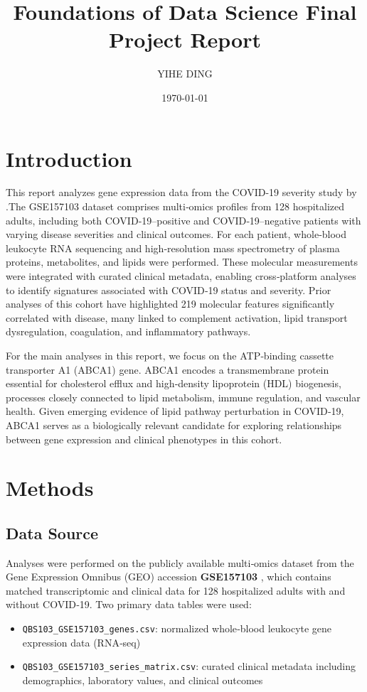 \documentclass[a4paper,12pt]{article}
\title{\textbf{Foundations of Data Science Final Project Report}}
\author{YIHE DING}
\date{\today}
\begin{document}
\maketitle
\tableofcontents
\newpage


\section{Introduction}

This report analyzes gene expression data from the COVID-19 severity study by \cite{overmyer2021large}.The GSE157103 dataset comprises multi‑omics profiles from 128 hospitalized adults, including both COVID‑19–positive and COVID‑19–negative patients with varying disease severities and clinical outcomes. For each patient, whole‑blood leukocyte RNA sequencing and high‑resolution mass spectrometry of plasma proteins, metabolites, and lipids were performed. These molecular measurements were integrated with curated clinical metadata, enabling cross‑platform analyses to identify signatures associated with COVID‑19 status and severity. Prior analyses of this cohort have highlighted 219 molecular features significantly correlated with disease, many linked to complement activation, lipid transport dysregulation, coagulation, and inflammatory pathways.

For the main analyses in this report, we focus on the ATP‑binding cassette transporter A1 (ABCA1) gene. ABCA1 encodes a transmembrane protein essential for cholesterol efflux and high‑density lipoprotein (HDL) biogenesis, processes closely connected to lipid metabolism, immune regulation, and vascular health. Given emerging evidence of lipid pathway perturbation in COVID‑19, ABCA1 serves as a biologically relevant candidate for exploring relationships between gene expression and clinical phenotypes in this cohort.




\section{Methods}

\subsection{Data Source}
Analyses were performed on the publicly available multi‑omics dataset from the Gene Expression Omnibus (GEO) accession \textbf{GSE157103}  \cite{overmyer2021large}, which contains matched transcriptomic and clinical data for 128 hospitalized adults with and without COVID‑19. Two primary data tables were used:
\begin{itemize}
    \item \texttt{QBS103\_GSE157103\_genes.csv}: normalized whole‑blood leukocyte gene expression data (RNA‑seq)
    \item \texttt{QBS103\_GSE157103\_series\_matrix.csv}: curated clinical metadata including demographics, laboratory values, and clinical outcomes
\end{itemize}
\end{document}
